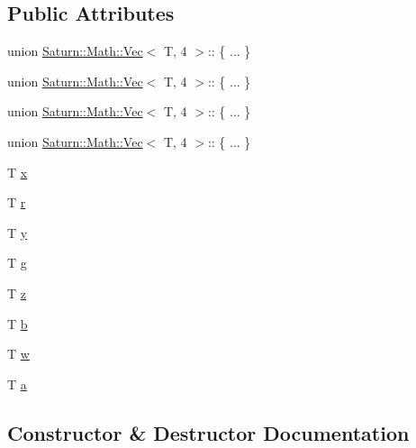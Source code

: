 \subsection*{Public Attributes}
\begin{DoxyCompactItemize}
\item 
union \mbox{\hyperlink{class_saturn_1_1_math_1_1_vec}{Saturn\+::\+Math\+::\+Vec}}$<$ T, 4 $>$\+:: \{ ... \}  
\item 
union \mbox{\hyperlink{class_saturn_1_1_math_1_1_vec}{Saturn\+::\+Math\+::\+Vec}}$<$ T, 4 $>$\+:: \{ ... \}  
\item 
union \mbox{\hyperlink{class_saturn_1_1_math_1_1_vec}{Saturn\+::\+Math\+::\+Vec}}$<$ T, 4 $>$\+:: \{ ... \}  
\item 
union \mbox{\hyperlink{class_saturn_1_1_math_1_1_vec}{Saturn\+::\+Math\+::\+Vec}}$<$ T, 4 $>$\+:: \{ ... \}  
\item 
T \mbox{\hyperlink{class_saturn_1_1_math_1_1_vec_3_01_t_00_014_01_4_a96ba8d89dcd8f257922c14be9c0ed0e6}{x}}
\item 
T \mbox{\hyperlink{class_saturn_1_1_math_1_1_vec_3_01_t_00_014_01_4_aff925ebbb77429a48e715114d4c569bd}{r}}
\item 
T \mbox{\hyperlink{class_saturn_1_1_math_1_1_vec_3_01_t_00_014_01_4_a22718ea2bd36dee2e0997b12db1d6017}{y}}
\item 
T \mbox{\hyperlink{class_saturn_1_1_math_1_1_vec_3_01_t_00_014_01_4_ad1f26680553d585f75bdea3a996f81dc}{g}}
\item 
T \mbox{\hyperlink{class_saturn_1_1_math_1_1_vec_3_01_t_00_014_01_4_afd100e7563d2cdc6a2a52d439302e0e0}{z}}
\item 
T \mbox{\hyperlink{class_saturn_1_1_math_1_1_vec_3_01_t_00_014_01_4_a3886d825a5f6ede727ccff525394e9a6}{b}}
\item 
T \mbox{\hyperlink{class_saturn_1_1_math_1_1_vec_3_01_t_00_014_01_4_a3d579cf8d1789c101453199838146eb6}{w}}
\item 
T \mbox{\hyperlink{class_saturn_1_1_math_1_1_vec_3_01_t_00_014_01_4_a3f7fc158e650010e17ad1a7d830089da}{a}}
\end{DoxyCompactItemize}


\subsection{Constructor \& Destructor Documentation}
\mbox{\label{class_saturn_1_1_math_1_1_vec_3_01_t_00_014_01_4_a6a2660e261781295d6d373a20d345c61}} 
